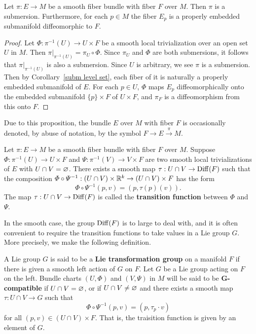 \begin{proposition}
Let $\pi:E\to M$ be a smooth fiber bundle with fiber $F$ over $M$. Then $\pi$ is a submersion. Furthermore, for each $p\in M$ the 
fiber $E_p$ is a properly embedded submanifold diffeomorphic to $F$.
\end{proposition}
\begin{proof}
Let $\varPhi:\pi^{-1}(U)\to U\times F$ be a smooth local trivialization over an open set $U$ in $M$. Then $\pi|_{\pi^{-1}(U)}=\pi_U\circ\varPhi$. Since $\pi_U$ and $\varPhi$ are both submersions, it follows 
that $\pi|_{\pi^{-1}(U)}$ is also a submersion. Since $U$ is arbitrary, we see $\pi$ is a submersion. Then by Corollary~\ref{subm level set}, each fiber of it is naturally a properly embedded submanifold of $E$. For each $p\in U$, $\varPhi$ maps $E_p$ diffeomorphically onto the embedded submanifold $\{p\}\times F$ of $U\times F$, and $\pi_F$ is a diffeomorphism from this onto $F$.
\end{proof}
Due to this proposition, the bundle $E$ over $M$ with fiber $F$ is occasionally denoted, by abuse of notation, by the symbol $F\to E\stackrel{\pi}{\to}M$.
\begin{lemma}\label{fiber bundle trivialization overlap}
Let $\pi:E\to M$ be a smooth fiber bundle with fiber $F$ over $M$. Suppose $\varPhi:\pi^{-1}(U)\to U\times F$ and $\varPsi:\pi^{-1}(V)\to V\times F$ are two smooth 
local trivializations of $E$ with $U\cap V=\varnothing$. There exists a smooth map $\tau:U\cap V\to\mathrm{Diff}(F)$ such that the composition $\varPhi\circ\varPsi^{-1}:(U\cap V)\times\mathbb{R}^k\to(U\cap V)\times F$ has the 
form
\[\varPhi\circ\varPsi^{-1}(p,v)=(p,\tau(p)(v)).\]
The map $\tau:U\cap V\to\mathrm{Diff}(F)$ is called the \textbf{transition function} between $\varPhi$ and $\varPsi$.
\end{lemma}
In the smooth case, the group $\mathrm{Diff}(F)$ is to large to deal with, and it is often convenient to require the transition functions to take values in a Lie group $G$. More precisely, we make the following definition.
\begin{definition}
A Lie group $G$ is said to be a \textbf{Lie transformation group} on a manifold $F$ if there is given a smooth left action of $G$ on $F$. Let $G$ be a Lie group acting 
on $F$ on the left. Bundle charts $(U,\varPhi)$ and $(V,\varPsi)$ in $M$ will be said to be \textbf{$\bm{G}$-compatible} if $U\cap V=\varnothing$, or if $U\cap V\neq\varnothing$ 
and there exists a smooth map $\tau:U\cap V\to G$ such that 
\[\varPhi\circ\varPsi^{-1}(p,v)=(p,\tau_p\cdot v)\]
for all $(p,v)\in(U\cap V)\times F$. That is, the traisition function is given by an element of $G$.
\end{definition}
